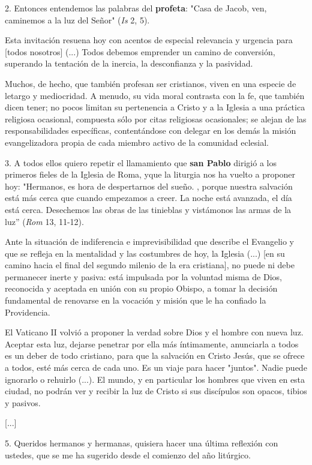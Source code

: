 2. Entonces entendemos las palabras del \textbf{profeta}: "Casa de
Jacob, ven, caminemos a la luz del Señor" (\emph{Is} 2, 5).

Esta invitación resuena hoy con acentos de especial relevancia y
urgencia para {[}todos nosotros{]} (...) Todos debemos emprender un
camino de conversión, superando la tentación de la inercia, la
desconfianza y la pasividad.

Muchos, de hecho, que también profesan ser cristianos, viven en una
especie de letargo y mediocridad. A menudo, su vida moral contrasta con
la fe, que también dicen tener; no pocos limitan su pertenencia a Cristo
y a la Iglesia a una práctica religiosa ocasional, compuesta sólo por
citas religiosas ocasionales; se alejan de las responsabilidades
específicas, contentándose con delegar en los demás la misión
evangelizadora propia de cada miembro activo de la comunidad eclesial.

3. A todos ellos quiero repetir el llamamiento que \textbf{san Pablo}
dirigió a los primeros fieles de la Iglesia de Roma, y ​​que la liturgia
nos ha vuelto a proponer hoy: "Hermanos, es hora de despertarnos del
sueño. , porque nuestra salvación está más cerca que cuando empezamos a
creer. La noche está avanzada, el día está cerca. Desechemos las obras
de las tinieblas y vistámonos las armas de la luz'' (\emph{Rom} 13,
11-12).

Ante la situación de indiferencia e imprevisibilidad que describe el
Evangelio y que se refleja en la mentalidad y las costumbres de hoy, la
Iglesia (...) {[}en su camino hacia el final del segundo milenio de la
era cristiana{]}, no puede ni debe permanecer inerte y pasiva: está
impulsada por la voluntad misma de Dios, reconocida y aceptada en unión
con su propio Obispo, a tomar la decisión fundamental de renovarse en la
vocación y misión que le ha confiado la Providencia.

El Vaticano II volvió a proponer la verdad sobre Dios y el hombre con
nueva luz. Aceptar esta luz, dejarse penetrar por ella más íntimamente,
anunciarla a todos es un deber de todo cristiano, para que la salvación
en Cristo Jesús, que se ofrece a todos, esté más cerca de cada uno. Es
un viaje para hacer "juntos". Nadie puede ignorarlo o rehuirlo (...). El
mundo, y en particular los hombres que viven en esta ciudad, no podrán
ver y recibir la luz de Cristo si sus discípulos son opacos, tibios y
pasivos.

{[}...{]}

5. Queridos hermanos y hermanas, quisiera hacer una última reflexión con
ustedes, que se me ha sugerido desde el comienzo del año litúrgico.

